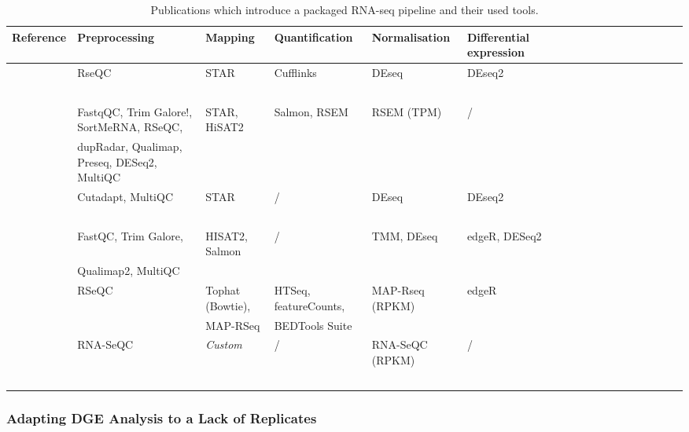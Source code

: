 \begin{landscape}
	\pagestyle{empty}
\begin{table}[h]
	\footnotesize
    \centering
    \captionsetup{font=footnotesize}
    \caption{Publications which introduce a packaged RNA-seq pipeline and their used tools.}
	\label{tab:packaged_pipelines}
    \begin{tabular}{llllllllllllllllll}
		\toprule
        \textbf{Reference} & \textbf{Preprocessing} & \textbf{Mapping} & \textbf{Quantification} & \textbf{Normalisation} &\textbf{ Differential expression} \\ \midrule
        \cite{cornwell2018viper} & RseQC & STAR & Cufflinks &  DEseq & DEseq2  \\ 
        ~ & ~ & ~ & ~ & ~ &   \\ \hline
        \cite{ewels2020nf} & FastqQC, Trim Galore!, SortMeRNA, RSeQC,  & STAR, HiSAT2 & Salmon, RSEM & RSEM (TPM) & /  \\ 
        ~ & dupRadar, Qualimap, Preseq, DESeq2, MultiQC & ~ & ~ & ~ &   \\ \hline
        \cite{koster2021snakemake} & Cutadapt, MultiQC & STAR & / &  DEseq & DEseq2  \\ 
        ~ & ~ & ~ & ~ & ~ &   \\ \hline
        \cite{zhang2020rasflow} & FastQC, Trim Galore,  & HISAT2, Salmon  & / & TMM,  DEseq & edgeR, DESeq2   \\ 
        ~ & Qualimap2, MultiQC  & ~ & ~ & ~ &   \\ \hline
        \cite{kalari2014map} & RSeQC & Tophat (Bowtie),  & HTSeq, featureCounts,  & MAP-Rseq (RPKM) & edgeR  \\ 
        ~ & ~ & MAP-RSeq & BEDTools Suite & ~ &   \\ \hline
        \cite{torres2014prada} & RNA-SeQC  & \textit{Custom} & / & RNA-SeQC (RPKM) & /  \\ 
        ~ & ~ & ~ & ~ & ~ &  \\ \bottomrule
    \end{tabular}
\end{table}
\end{landscape}


\subsubsection{Adapting DGE Analysis to a Lack of Replicates}
\label{DGE no replicates}

